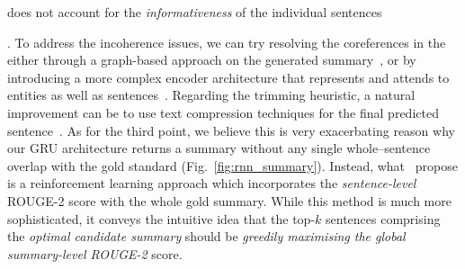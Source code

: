 \begin{itemize}
\begin{enumerate*}[label=(\alph*)]
            \item does not account for the \emph{informativeness} of the individual sentences
        \end{enumerate*}.
        To address the incoherence issues, we can try resolving the coreferences in the either through a
        graph-based approach on the generated summary~\cite{sonawane2016coreference}, or by introducing a more complex
        encoder architecture that represents and attends to entities as well as sentences~\cite{Huang2021ExtractiveSC}.
        Regarding the trimming heuristic, a natural improvement can be to use text compression techniques for the final predicted sentence~\cite{ghalandari2022efficient, KNIGHT200291}.
        As for the third point, we believe this is very exacerbating reason why our GRU architecture returns a summary
        without any single whole--sentence overlap with the gold standard (Fig.~\ref{fig:rnn_summary}).
        Instead, what~\cite{zmandar-etal-2021-joint} propose is a reinforcement learning approach which incorporates
        the \emph{sentence-level} ROUGE-2 score with the whole gold summary.
        While this method is much more sophisticated, it conveys the intuitive idea that the top-$k$ sentences comprising the
        \emph{optimal candidate summary} should be \emph{greedily maximising the global summary-level ROUGE-2} score.
\end{itemize}

